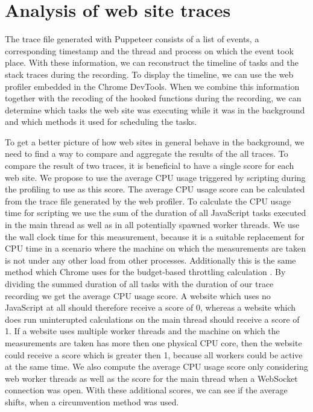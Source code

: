 \documentclass[
	ruledheaders=section,%
	class=report,%
	thesis={type=bachelor},%
	accentcolor=9c,%
	custommargins=true,%
	marginpar=false,%
	parskip=half-,%
	fontsize=11pt,%
]{tudapub}
\begin{document}
  \section{Analysis of web site traces}
  \label{sec:trace-analysis}

  The trace file generated with Puppeteer consists of a list of events, a corresponding timestamp and the thread and process on which the event took place. With these information, we can reconstruct the timeline of tasks and the stack traces during the recording. To display the timeline, we can use the web profiler embedded in the Chrome DevTools. When we combine this information together with the recoding of the hooked functions during the recording, we can determine which tasks the web site was executing while it was in the background and which methods it used for scheduling the tasks.

  To get a better picture of how web sites in general behave in the background, we need to find a way to compare and aggregate the results of the all traces. To compare the result of two traces, it is beneficial to have a single score for each web site. We propose to use the average CPU usage triggered by scripting during the profiling to use as this score. The average CPU usage score can be calculated from the trace file generated by the web profiler. To calculate the CPU usage time for scripting we use the sum of the duration of all JavaScript tasks executed in the main thread as well as in all potentially spawned worker threads. We use the wall clock time for this measurement, because it is a suitable replacement for CPU time in a scenario where the machine on which the measurements are taken is not under any other load from other processes. Additionally this is the same method which Chrome uses for the budget-based throttling calculation \cite{chrome-background-tabs}. By dividing the summed duration of all tasks with the duration of our trace recording we get the average CPU usage score. A website which uses no JavaScript at all should therefore receive a score of 0, whereas a website which does run uninterupted calculations on the main thread should receive a score of 1. If a website uses multiple worker threads and the machine on which the measurements are taken has more then one physical CPU core, then the website could receive a score which is greater then 1, because all workers could be active at the same time. We also compute the average CPU usage score only considering web worker threads as well as the score for the main thread when a WebSocket connection was open. With these additional scores, we can see if the average shifts, when a circumvention method was used.
\end{document}
